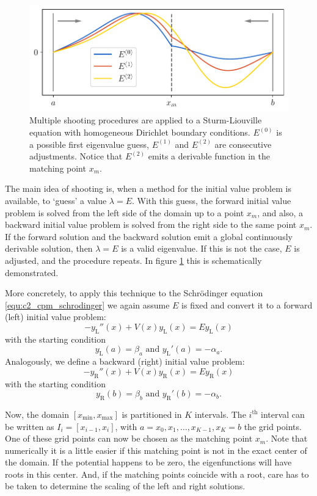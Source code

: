 \begin{figure}
    \begin{center}
        \includegraphics[width=\linewidth]{img/chapter2/shooting_schematic.pdf}
        \caption{Multiple shooting procedures are applied to a Sturm-Liouville equation with homogeneous Dirichlet boundary conditions. $E^{(0)}$ is a possible first eigenvalue guess, $E^{(1)}$ and $E^{(2)}$ are consecutive adjustments. Notice that $E^{(2)}$ emits a derivable function in the matching point $x_m$.}
        \label{fig:c2_shooting_schematic}
    \end{center}
\end{figure}

The main idea of shooting is, when a method for the initial value problem is available, to `guess' a value $\lambda = E$. With this guess, the forward initial value problem is solved from the left side of the domain up to a point $x_m$, and also, a backward initial value problem is solved from the right side to the same point $x_m$. If the forward solution and the backward solution emit a global continuously derivable solution, then $\lambda = E$ is a valid eigenvalue. If this is not the case, $E$ is adjusted, and the procedure repeats. In figure \ref{fig:c2_shooting_schematic} this is schematically demonstrated.

More concretely, to apply this technique to the Schrödinger equation \eqref{equ:c2_cpm_schrodinger} we again assume $E$ is fixed and convert it to a forward (left) initial value problem:
$$
    -y_\text{L}''(x) + V(x) y_\text{L}(x) = E y_\text{L}(x)
$$
with the starting condition
$$
    y_\text{L}(a) = \beta_a \text{ and } y_\text{L}'(a) = -\alpha_a\text{.}
$$
Analogously, we define a backward (right) initial value problem:
$$
    -y_\text{R}''(x) + V(x) y_\text{R}(x) = E y_\text{R}(x)
$$
with the starting condition
$$
    y_\text{R}(b) = \beta_b \text{ and } y_\text{R}'(b) = -\alpha_b\text{.}
$$

Now, the domain $[x_\text{min}, x_\text{max}]$ is partitioned in $K$ intervals. The $i^\text{th}$ interval can be written as $I_i = [x_{i-1}, x_{i}]$, with $a = x_0, x_1, \dots, x_{K-1}, x_{K} = b$ the grid points. One of these grid points can now be chosen as the matching point $x_m$. Note that numerically it is a little easier if this matching point is not in the exact center of the domain. If the potential happens to be zero, the eigenfunctions will have roots in this center. And, if the matching points coincide with a root, care has to be taken to determine the scaling of the left and right solutions.

